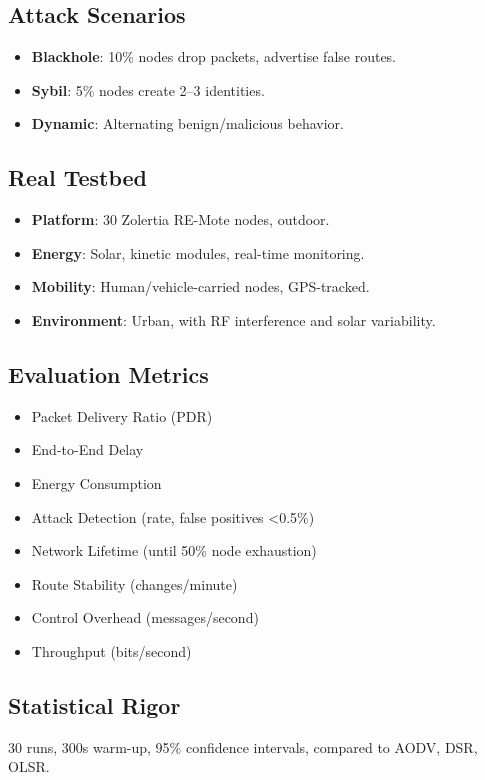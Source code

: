 \documentclass[preprint]{elsarticle}
\begin{document}
\subsection{Attack Scenarios}
\begin{itemize}
    \item \textbf{Blackhole}: 10\% nodes drop packets, advertise false routes.
    \item \textbf{Sybil}: 5\% nodes create 2–3 identities.
    \item \textbf{Dynamic}: Alternating benign/malicious behavior.
\end{itemize}

\subsection{Real Testbed}
\begin{itemize}
    \item \textbf{Platform}: 30 Zolertia RE-Mote nodes, outdoor.
    \item \textbf{Energy}: Solar, kinetic modules, real-time monitoring.
    \item \textbf{Mobility}: Human/vehicle-carried nodes, GPS-tracked.
    \item \textbf{Environment}: Urban, with RF interference and solar variability.
\end{itemize}

\subsection{Evaluation Metrics}
\begin{itemize}
    \item Packet Delivery Ratio (PDR)
    \item End-to-End Delay
    \item Energy Consumption
    \item Attack Detection (rate, false positives <0.5\%)
    \item Network Lifetime (until 50\% node exhaustion)
    \item Route Stability (changes/minute)
    \item Control Overhead (messages/second)
    \item Throughput (bits/second)
\end{itemize}

\subsection{Statistical Rigor}
30 runs, 300s warm-up, 95\% confidence intervals, compared to AODV, DSR, OLSR.
\end{document}
